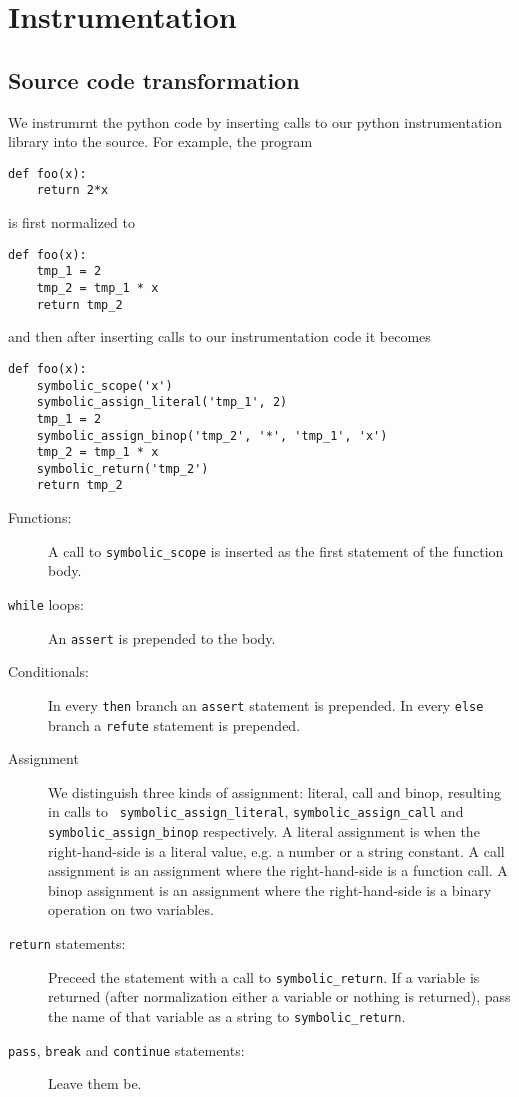 \documentclass[11pt]{report}
\begin{document}

\chapter{Instrumentation}
\label{ch:instumentation}

\section{Source code transformation}
We instrumrnt the python code by inserting calls to our python
instrumentation library into the source. For example, the program
\begin{verbatim}
def foo(x):
    return 2*x
\end{verbatim}
is first normalized to
\begin{verbatim}
def foo(x):
    tmp_1 = 2
    tmp_2 = tmp_1 * x
    return tmp_2
\end{verbatim}
and then after inserting calls to our instrumentation code it becomes
\begin{verbatim}
def foo(x):
    symbolic_scope('x')
    symbolic_assign_literal('tmp_1', 2)
    tmp_1 = 2
    symbolic_assign_binop('tmp_2', '*', 'tmp_1', 'x')
    tmp_2 = tmp_1 * x
    symbolic_return('tmp_2')
    return tmp_2
\end{verbatim}

\begin{description}
  \item[Functions:] A call to {\tt symbolic\_scope} is inserted as the
    first statement of the function body.
  \item[{\tt while} loops:] An {\tt assert} is prepended to the body.
  \item[Conditionals:] In every {\tt then} branch an {\tt assert}
    statement is prepended. In every {\tt else} branch a {\tt refute}
    statement is prepended.
  \item[Assignment] We distinguish three kinds of assignment: literal,
    call and binop, resulting in calls to {\tt
      symbolic\_assign\_literal}, {\tt symbolic\_assign\_call} and
    {\tt symbolic\_assign\_binop} respectively. A literal assignment
    is when the right-hand-side is a literal value, e.g. a number or a
    string constant. A call assignment is an assignment where the
    right-hand-side is a function call. A binop assignment is an
    assignment where the right-hand-side is a binary operation on two
    variables.
  \item[{\tt return} statements:] Preceed the statement with a call to
    {\tt symbolic\_return}. If a variable is returned (after
    normalization either a variable or nothing is returned), pass the
    name of that variable as a string to {\tt symbolic\_return}.
  \item[{\tt pass}, {\tt break} and {\tt continue} statements:] Leave
    them be.
\end{description}
\end{document}
